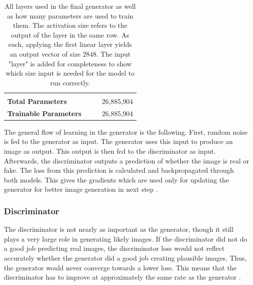 \documentclass[12pt, fleqn, titlepage]{article}
\begin{document}
\begin{table}[H]
\begin{tabular}{llll}
		                             &                 &       &              \\
		\textbf{Total Parameters}    &                 &       & 26,885,904   \\
		\textbf{Trainable Parameters}&                 &       & 26,885,904   \\  \bottomrule
	\end{tabular}
	\caption{All layers used in the final generator as well as how many parameters are used to train them. The activation size refers to the output of the layer in the same row. As such, applying the first linear layer yields an output vector of size $2848$. The input "layer" is added for completeness to show which size input is needed for the model to run correctly.}
	\label{tab:gan_generator}
\end{table}

The general flow of learning in the generator is the following. First, random noise is fed to the generator as input. The generator uses this input to produce an image as output. This output is then fed to the discriminator as input. Afterwards, the discriminator outputs a prediction of whether the image is real or fake. The loss from this prediction is calculated and backpropagated through both models. This gives the gradients which are used only for updating the generator for better image generation in next step \cite{developers.google_generator}.

\subsubsection{Discriminator}
The discriminator is not nearly as important as the generator, though it still plays a very large role in generating likely images. If the discriminator did not do a good job predicting real images, the discriminator loss would not reflect accurately whether the generator did a good job creating plausible images. Thus, the generator would never converge towards a lower loss. This means that the discriminator has to improve at approximately the same rate as the generator \cite{developers.google_discriminator, developers.google_training}.
\end{document}
